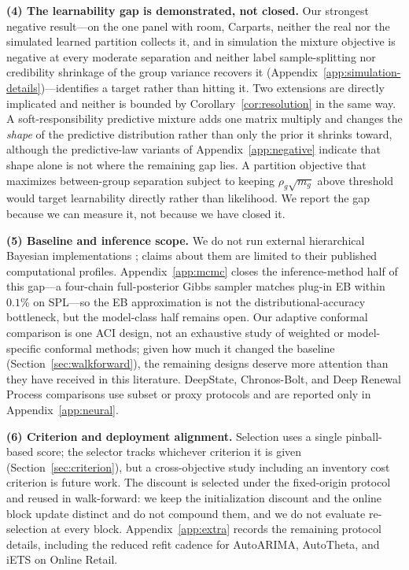 \documentclass[twocolumn,10pt]{article}
\theoremstyle{definition}
\begin{document}
\textbf{(4) The learnability gap is demonstrated, not closed.} %
Our
strongest negative result---on the one panel with room, Carparts, neither
the real nor the simulated learned partition collects it, and in
simulation the mixture objective is negative at every moderate
separation and neither label sample-splitting nor credibility shrinkage
of the group variance recovers it (Appendix~\ref{app:simulation-details})---identifies a target rather than hitting it. Two
extensions are directly implicated and neither is bounded by
Corollary~\ref{cor:resolution} in the same way. A soft-responsibility
predictive mixture adds one matrix multiply and changes the \emph{shape}
of the predictive distribution rather than only the prior it shrinks
toward, although the predictive-law variants of Appendix~\ref{app:negative}
indicate that shape alone is not where the remaining gap lies. A partition objective that maximizes between-group separation
subject to keeping $\rho_g\sqrt{m_g}$ above threshold would target
learnability directly rather than likelihood. We report the gap because we
can measure it, not because we have closed it.

\textbf{(5) Baseline and inference scope.} We do not run external
hierarchical Bayesian implementations
\citep{chapados2014,seeger2016,pitkin2024}; claims about them are limited
to their published computational profiles.
Appendix~\ref{app:mcmc} closes the inference-method half of this gap---a
four-chain full-posterior Gibbs sampler matches plug-in EB within $0.1\%$
on SPL---so the EB approximation is not the distributional-accuracy
bottleneck, but the model-class half remains open. Our adaptive conformal
comparison is one ACI design, not an exhaustive study of weighted or
model-specific conformal methods; given how much it changed the baseline
(Section~\ref{sec:walkforward}), the remaining designs deserve more
attention than they have received in this literature. DeepState,
Chronos-Bolt, and Deep Renewal Process comparisons use subset or proxy
protocols and are reported only in Appendix~\ref{app:neural}.

\textbf{(6) Criterion and deployment alignment.} Selection uses a single
pinball-based score; the selector tracks whichever criterion it is given
(Section~\ref{sec:criterion}), but a cross-objective study including an
inventory cost criterion is future work. The discount is selected under
the fixed-origin protocol and reused in walk-forward: we keep the
initialization discount and the online block update distinct and do not
compound them, and we do not evaluate re-selection at every block.
Appendix~\ref{app:extra} records the remaining protocol details, including
the reduced refit cadence for AutoARIMA, AutoTheta, and iETS on Online
Retail.
\end{document}
